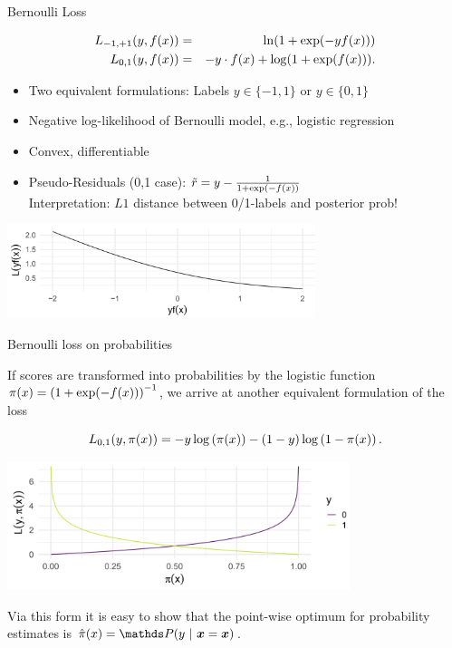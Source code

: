 \begin{vbframe}{Bernoulli Loss}

\vspace*{-0.5cm}
\begin{eqnarray*}
  L_{-1, +1}(y, f(x)) &=& \ln(1+\exp(-yf(x))) \\
  L_{0, 1}(y, f(x)) &=& - y \cdot f(x) + \log(1 + \exp(f(x))). 
\end{eqnarray*}

\begin{itemize}
  \item Two equivalent formulations: Labels $y \in \{-1, 1\}$ or $y \in \{0, 1\}$
  \item Negative log-likelihood of Bernoulli model, e.g., logistic regression
  \item Convex, differentiable
  \item Pseudo-Residuals (0,1 case): $\tilde{r} = y - \frac{1}{1+\exp(-f(x))}$\\   
    Interpretation: $L1$ distance between 0/1-labels and posterior prob!
\end{itemize}

\vspace{0.2cm}
\begin{center}
\includegraphics[width = 9cm ]{figure_man/bernoulli.png} \\
\end{center}

\end{vbframe}




\begin{vbframe}{Bernoulli loss on probabilities}

If scores are transformed into probabilities by the logistic function  $\pi(x) = \left(1 + \exp(- f(x))\right)^{-1}$, we arrive at another equivalent formulation of the loss

  $$
    L_{0,1}(y, \pi(x)) = - y \log \left(\pi(x)\right) - (1 - y) \log \left(1 - \pi(x)\right). 
  $$

\begin{center}
\includegraphics[width = 10cm ]{figure_man/bernoulli-loss.png} \\
\end{center}

Via this form it is easy to show that the point-wise optimum for probability estimates is $\pixh = \P(y~|~\xv = \xv)$.

\end{vbframe}




